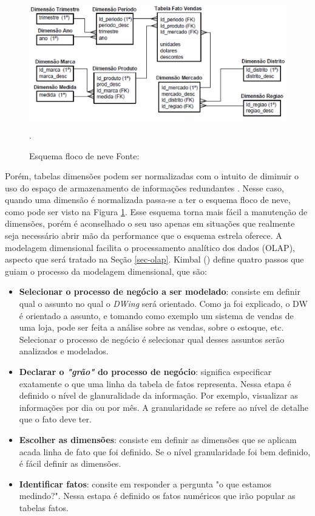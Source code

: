 \begin{figure}[!htb]
 	\centering
 		\includegraphics[scale=1]{figuras/dw-modelo-flocodeneve}
 		\caption{Esquema floco de neve  Fonte: \cite{Wagner2012}}.
 		\label{dw-snowflackscheme}
 \end{figure}

Porém, tabelas dimensões podem ser normalizadas com o intuito de diminuir o uso do espaço de armazenamento de informações redundantes \cite{kimball2002}. Nesse caso, quando uma dimensão é normalizada passa-se a ter o esquema floco de neve, como pode ser visto na Figura \ref{dw-snowflackscheme}. Esse esquema torna mais fácil a manutenção de dimensões, porém é aconselhado o seu uso apenas em situações que realmente seja necessário abrir mão da performance que o esquema estrela oferece.
%
A modelagem dimensional facilita o processamento analítico dos dados (OLAP), aspecto que será tratado na Seção \ref{sec-olap}.
%
Kimbal (\citeyear{kimball2002}) define quatro passos que guiam o processo da modelagem dimensional, que são:

 \begin{itemize}

 	\item \textbf{Selecionar o processo de negócio a ser modelado}: consiste em definir qual o assunto no qual o \emph{DWing} será orientado. Como ja foi explicado, o DW é orientado a assunto, e tomando como exemplo um sistema de vendas de uma loja, pode ser feita a análise sobre as vendas, sobre o estoque, etc. Selecionar o processo de negócio é selecionar qual desses assuntos serão analizados e modelados.

 	\item \textbf{Declarar o \emph{"grão"} do processo de negócio}: significa especificar exatamente o que uma linha da tabela de fatos representa. Nessa etapa é definido o nível de glanuralidade da informação. Por exemplo, visualizar as informações por dia ou por mês. A granularidade se refere ao nível de detalhe que o fato deve ter. 

 	\item \textbf{Escolher as dimensões}: consiste em definir as dimensões que se aplicam acada linha de fato que foi definido. Se o nível granularidade foi bem definido, é fácil definir as dimensões. 

 	\item \textbf{Identificar fatos}: consite em responder a pergunta "o que estamos medindo?". Nessa estapa é definido os fatos numéricos que irão popular as tabelas fatos.	  
 \end{itemize}

